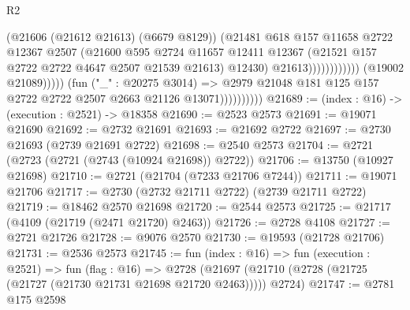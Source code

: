 \begin{lexlean}{R2}
\begin{coremodule}
                                                    (@21606 (@21612 @21613) (@6679 @8129))
                                                    (@21481
                                                      @618
                                                      @157
                                                      @11658
                                                      @2722
                                                      @12367
                                                      @2507
                                                      (@21600
                                                        @595
                                                        @2724
                                                        @11657
                                                        @12411
                                                        @12367
                                                        (@21521
                                                          @157
                                                          @2722
                                                          @2722
                                                          @4647
                                                          @2507
                                                          @21539
                                                          @21613)
                                                        @12430)
                                                      @21613))))))))))))
                              (@19002 @21089)))))
                      (fun ("_" : @20275 @3014) =>
                      @2979 @21048 @181 @125 @157 @2722 @2722 @2507 @2663 @21126 @13071))))))))))
@21689 := (index : @16) -> (execution : @2521) -> @18358
@21690 := @2523 @2573
@21691 := @19071 @21690
@21692 := @2732 @21691
@21693 := @21692 @2722
@21697 := @2730 @21693 (@2739 @21691 @2722)
@21698 := @2540 @2573
@21704 := @2721 (@2723 (@2721 (@2743 (@10924 @21698)) @2722))
@21706 := @13750 (@10927 @21698)
@21710 := @2721 (@21704 (@7233 @21706 @7244))
@21711 := @19071 @21706
@21717 := @2730 (@2732 @21711 @2722) (@2739 @21711 @2722)
@21719 := @18462 @2570 @21698
@21720 := @2544 @2573
@21725 := @21717 (@4109 (@21719 (@2471 @21720) @2463))
@21726 := @2728 @4108
@21727 := @2721 @21726
@21728 := @9076 @2570
@21730 := @19593 (@21728 @21706)
@21731 := @2536 @2573
@21745 := fun (index : @16) =>
  fun (execution : @2521) =>
  fun (flag : @16) =>
  @2728 (@21697 (@21710 (@2728 (@21725 (@21727 (@21730 @21731 @21698 @21720 @2463))))) @2724)
@21747 := @2781 @175 @2598

\end{coremodule}
\end{lexlean}
